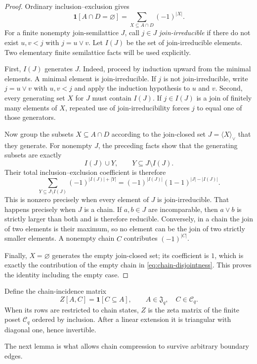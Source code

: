 \documentclass[11pt,reqno]{amsart}
\theoremstyle{definition}
\begin{document}
\begin{proof}
Ordinary inclusion--exclusion gives
\[
 \mathbf1[A\cap D=\varnothing]
 =\sum_{X\subseteq A\cap D}(-1)^{|X|}.
\]
For a finite nonempty join-semilattice $J$, call $j\in J$
\emph{join-irreducible} if there do not exist $u,v<j$ with $j=u\vee v$.
Let $I(J)$ be the set of join-irreducible elements.  Two elementary finite
semilattice facts will be used explicitly.

First, $I(J)$ generates $J$.  Indeed, proceed by induction upward from the
minimal elements.  A minimal element is join-irreducible.  If $j$ is not
join-irreducible, write $j=u\vee v$ with $u,v<j$ and apply the induction
hypothesis to $u$ and $v$.  Second, every generating set $X$ for $J$ must
contain $I(J)$.  If $j\in I(J)$ is a join of finitely many elements of $X$,
repeated use of join-irreducibility forces $j$ to equal one of those
generators.

Now group the subsets $X\subseteq A\cap D$ according to the join-closed set
$J=\langle X\rangle_\vee$ that they generate.  For nonempty $J$, the preceding
facts show that the generating subsets are exactly
\[
 I(J)\cup Y,\qquad Y\subseteq J\setminus I(J).
\]
Their total inclusion--exclusion coefficient is therefore
\[
 \sum_{Y\subseteq J\setminus I(J)}(-1)^{|I(J)|+|Y|}
 =(-1)^{|I(J)|}(1-1)^{|J|-|I(J)|}.
\]
This is nonzero precisely when every element of $J$ is join-irreducible.
That happens precisely when $J$ is a chain.  If $a,b\in J$ are incomparable,
then $a\vee b$ is strictly larger than both and is therefore reducible.
Conversely, in a chain the join of two elements is their maximum, so no element
can be the join of two strictly smaller elements.  A nonempty chain $C$
contributes $(-1)^{|C|}$.

Finally, $X=\varnothing$ generates the empty join-closed set; its coefficient
is $1$, which is exactly the contribution of the empty chain in
\eqref{eq:chain-disjointness}.  This proves the identity including the empty
case.
\end{proof}

Define the chain-incidence matrix
\[
 Z[A,C]=\mathbf1[C\subseteq A],
 \qquad A\in\mathfrak J_q,
 \quad C\in\mathcal C_q.
\]
When its rows are restricted to chain states, $Z$ is the zeta matrix of the
finite poset $\mathcal C_q$ ordered by inclusion.  After a linear extension it
is triangular with diagonal one, hence invertible.

The next lemma is what allows chain compression to survive arbitrary boundary
edges.
\end{document}
